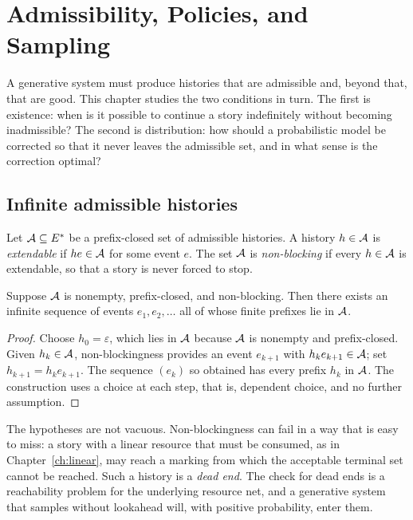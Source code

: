 \chapter{Admissibility, Policies, and Sampling}
\label{ch:admissibility}

A generative system must produce histories that are admissible and, beyond that, that are good. This chapter studies the two conditions in turn. The first is existence: when is it possible to continue a story indefinitely without becoming inadmissible? The second is distribution: how should a probabilistic model be corrected so that it never leaves the admissible set, and in what sense is the correction optimal?

\section{Infinite admissible histories}

Let $\mathcal{A}\subseteq E^*$ be a prefix-closed set of admissible histories. A history $h\in\mathcal{A}$ is \emph{extendable} if $he\in\mathcal{A}$ for some event $e$. The set $\mathcal{A}$ is \emph{non-blocking} if every $h\in\mathcal{A}$ is extendable, so that a story is never forced to stop.

\begin{proposition}\label{prop:chains}
Suppose $\mathcal{A}$ is nonempty, prefix-closed, and non-blocking. Then there exists an infinite sequence of events $e_1,e_2,\dots$ all of whose finite prefixes lie in $\mathcal{A}$.
\end{proposition}

\begin{proof}
Choose $h_0=\varepsilon$, which lies in $\mathcal{A}$ because $\mathcal{A}$ is nonempty and prefix-closed. Given $h_k\in\mathcal{A}$, non-blockingness provides an event $e_{k+1}$ with $h_ke_{k+1}\in\mathcal{A}$; set $h_{k+1}=h_ke_{k+1}$. The sequence $(e_k)$ so obtained has every prefix $h_k$ in $\mathcal{A}$. The construction uses a choice at each step, that is, dependent choice, and no further assumption.
\end{proof}

The hypotheses are not vacuous. Non-blockingness can fail in a way that is easy to miss: a story with a linear resource that must be consumed, as in Chapter~\ref{ch:linear}, may reach a marking from which the acceptable terminal set cannot be reached. Such a history is a \emph{dead end}. The check for dead ends is a reachability problem for the underlying resource net, and a generative system that samples without lookahead will, with positive probability, enter them.

